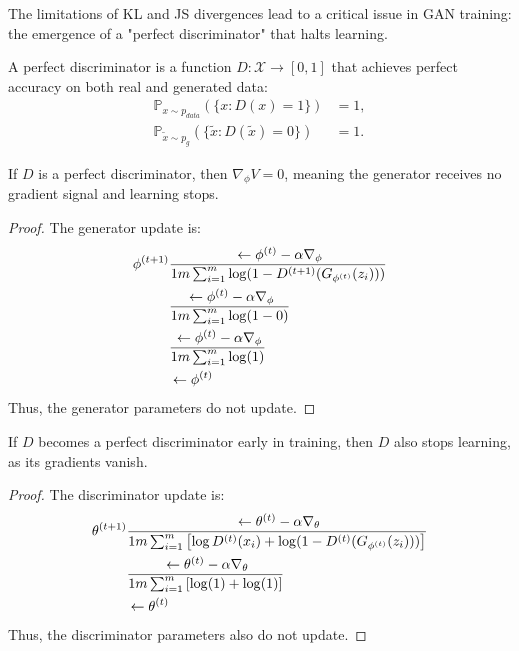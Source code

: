The limitations of KL and JS divergences lead to a critical issue in GAN training: the emergence of a "perfect discriminator" that halts learning.

\begin{definition}%
  \label{def:perfect-discriminator}
  A \textnormal{\sffamily perfect discriminator} is a function $D: \mathcal{X} \to [0,1]$ that achieves perfect accuracy on both real and generated data:
  \begin{align}
    \mathbb{P}_{x \sim p_{data}}(\{x : D(x) = 1\}) &= 1, \\
    \mathbb{P}_{\tilde{x} \sim p_g}(\{\tilde{x} : D(\tilde{x}) = 0\}) &= 1.
  \end{align}
\end{definition}

\begin{theorem}%
  \label{thm:perfect-discriminator}
  If $D$ is a perfect discriminator, then $\nabla_\phi V = 0$, meaning the generator receives no gradient signal and learning stops.
\end{theorem}
\begin{proof}
  The generator update is:
  \begin{align}
    \phi^{(t+1)} &\gets \phi^{(t)} - \alpha \nabla_\phi \over{1}{m} \sum_{i=1}^m \log(1 - D^{(t+1)}(G_{\phi^{(t)}}(z_i))) \\
    &\gets \phi^{(t)} - \alpha \nabla_\phi \over{1}{m} \sum_{i=1}^m \log(1 - 0) \\
    &\gets \phi^{(t)} - \alpha \nabla_\phi \over{1}{m} \sum_{i=1}^m \log(1) \\
    &\gets \phi^{(t)}
  \end{align}
  Thus, the generator parameters do not update.
\end{proof}

\begin{theorem}%
  \label{thm:too-early}
  If $D$ becomes a perfect discriminator early in training, then $D$ also stops learning, as its gradients vanish.
\end{theorem}
\begin{proof}
  The discriminator update is:
  \begin{align}
    \theta^{(t+1)} &\gets \theta^{(t)} - \alpha \nabla_\theta \over{1}{m} \sum_{i=1}^m \left[ \log D^{(t)}(x_i) + \log(1 - D^{(t)}(G_{\phi^{(t)}}(z_i))) \right] \\
    &\gets \theta^{(t)} - \alpha \nabla_\theta \over{1}{m} \sum_{i=1}^m \left[ \log(1) + \log(1) \right] \\
    &\gets \theta^{(t)}
  \end{align}
  Thus, the discriminator parameters also do not update.
\end{proof}

